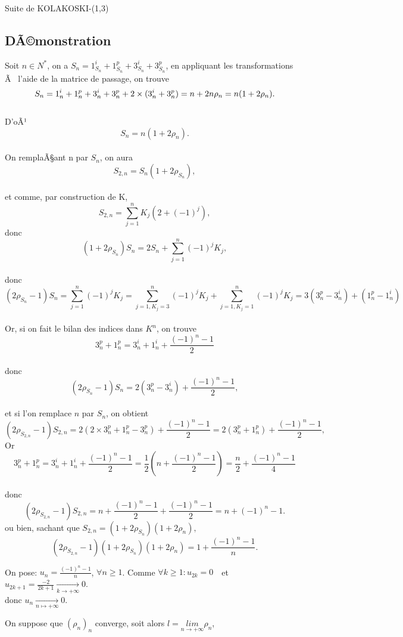 \documentclass[12pt,a4paper,oneside]{book}
\begin{document}
\begin{titlepage}
\begin{chapter}{Suite de KOLAKOSKI-(1,3)}
\subsection{DÃ©monstration}
Soit $n \in N^*$, 
on a $S_n=1_{S_n}^i+1_{S_n}^p+3_{S_n}^i+3_{S_n}^p $, 
en appliquant les transformations Ã  l'aide de la matrice de passage, on trouve\\
 $$S_n=1_n^i+1_n^p+3_n^i+3_n^p+2 \times (3_n^i+3_n^p) \\
 =n+2n \rho_n\\ =n(1+2 \rho_n).$$ \\
D'oÃ¹ $$S_n=n(1+2 \rho_n).$$\\
On remplaÃ§ant n par $S_n$, on aura $$ S_{2,n}=S_n(1+2 \rho_{S_n}),$$\\
et comme, par construction de K, $$ S_{2,n}=\sum_{j=1}^n K_j(2+(-1)^j), $$ 
donc $$(1+2 \rho_{S_n})S_n= 2S_n+ \sum_{j=1}^n(-1)^jK_j,$$ \\
donc $$ 
 (2\rho_{S_n}-1)S_n =\sum_{j=1}^n(-1)^jK_j
 =\sum_{j=1,K_j=3}^n(-1)^jK_j+\sum_{j=1,K_j=1}^n(-1)^jK_j
 =3(3_n^p-3_n^i)+(1_n^p-1_n^i)
$$ \\  
Or, si on fait le bilan des indices dans $K^n$, on trouve $$ 3_n^p+1_n^p=3_n^i+1_n^i+\dfrac{(-1)^n-1}{2}$$ \\ donc 
$$(2\rho_{S_n}-1)S_n=2(3_n^p-3_n^i)+\frac{(-1)^n-1}{2},$$\\ 
et si l'on remplace $n$ par $S_n$, on obtient $$(2\rho_{S_{2,n}}-1)S_{2,n}=2(2 \times 3_n^p+1_n^p-3_n^p)+ \frac{(-1)^n-1}{2}=2(3_n^p+1_n^p)+\frac{(-1)^n-1}{2},$$
Or $$3_n^p+1_n^p=3_n^i+1_n^i+\frac{(-1)^n-1}{2}=\frac{1}{2}(n+\frac{(-1)^n-1}{2})=\frac{n}{2}+\frac{(-1)^n-1}{4}$$\\ 
donc $$(2\rho_S_{2,n}-1)S_{2,n}=n+\frac{(-1)^n-1}{2}+\frac{(-1)^n-1}{2}=n+(-1)^n-1.$$ 
ou bien, sachant que $S_{2,n}=(1+2\rho_{S_n})(1+2\rho_n),$
\begin{equation}
(2 \rho_{S_{2,n}}-1)(1+2\rho_{S_n})(1+2\rho_n)=1+\frac{(-1)^n-1}{n}.\end{equation}
\par On pose: $u_n= \frac{(-1)^n-1}{n}$, $\forall n \geq 1$. Comme $\forall k \geq 1: u_{2k}=0$ \,\ et \,\ $ u_{2k+1}=\frac{-2}{2k+1}\underset{k\rightarrow + \infty}{\longrightarrow} 0$.\\
 donc $ u_n\underset{n \longmapsto + \infty}{\longrightarrow} 0$.\\
\par On suppose que $(\rho_n)_n$ converge, soit alors $l=\underset{n\rightarrow + \infty}{l i m}\rho_n$, \\

\end{chapter}
\end{titlepage}
\end{document}
